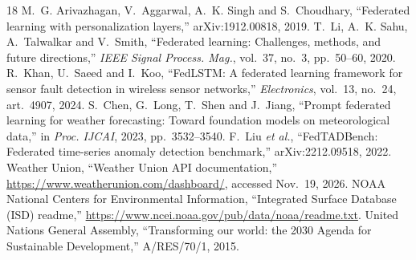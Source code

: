 \documentclass[conference,a4paper]{IEEEtran}
\begin{document}
\begin{thebibliography}{18}
 M.~G. Arivazhagan, V.~Aggarwal, A.~K. Singh and S.~Choudhary, ``Federated learning with personalization layers,'' arXiv:1912.00818, 2019.
 T.~Li, A.~K. Sahu, A.~Talwalkar and V.~Smith, ``Federated learning: Challenges, methods, and future directions,'' \emph{IEEE Signal Process. Mag.}, vol.~37, no.~3, pp.~50--60, 2020.
 R.~Khan, U.~Saeed and I.~Koo, ``FedLSTM: A federated learning framework for sensor fault detection in wireless sensor networks,'' \emph{Electronics}, vol.~13, no.~24, art.~4907, 2024.
 S.~Chen, G.~Long, T.~Shen and J.~Jiang, ``Prompt federated learning for weather forecasting: Toward foundation models on meteorological data,'' in \emph{Proc. IJCAI}, 2023, pp.~3532--3540.
 F.~Liu \emph{et al.}, ``FedTADBench: Federated time-series anomaly detection benchmark,'' arXiv:2212.09518, 2022.
 Weather Union, ``Weather Union API documentation,'' \url{https://www.weatherunion.com/dashboard/}, accessed Nov.~19, 2026.
 NOAA National Centers for Environmental Information, ``Integrated Surface Database (ISD) readme,'' \url{https://www.ncei.noaa.gov/pub/data/noaa/readme.txt}.
 United Nations General Assembly, ``Transforming our world: the 2030 Agenda for Sustainable Development,'' A/RES/70/1, 2015.
\end{thebibliography}
\end{document}
